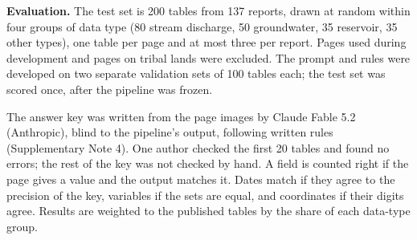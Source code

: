 \textbf{Evaluation.} The test set is 200 tables from 137 reports, drawn at random within four groups of data type (80 stream discharge, 50 groundwater, 35 reservoir, 35 other types), one table per page and at most three per report. Pages used during development and pages on tribal lands were excluded. The prompt and rules were developed on two separate validation sets of 100 tables each; the test set was scored once, after the pipeline was frozen.

The answer key was written from the page images by Claude Fable 5.2 (Anthropic), blind to the pipeline's output, following written rules (Supplementary Note 4). One author checked the first 20 tables and found no errors; the rest of the key was not checked by hand. A field is counted right if the page gives a value and the output matches it. Dates match if they agree to the precision of the key, variables if the sets are equal, and coordinates if their digits agree. Results are weighted to the published tables by the share of each data-type group.

